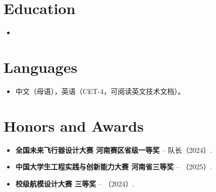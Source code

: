 \documentclass[11pt,a4paper,sans]{moderncv}
\begin{document}

\section{Education}
\vspace{1pt}
\begin{itemize}

\item{}

\end{itemize}


\section{Languages}
\vspace{1pt}
\begin{itemize}
\item 中文（母语），英语（CET-4，可阅读英文技术文档）。
\end{itemize}


\section{Honors and Awards}
\vspace{1pt}
\begin{itemize}
\item{\textbf{全国未来飞行器设计大赛 河南赛区省级一等奖} -- 队长（2024）.}
\item{\textbf{中国大学生工程实践与创新能力大赛 河南省三等奖} -- （2025）.}
\item{\textbf{校级航模设计大赛 三等奖} -- （2024）.}
\end{itemize}


\end{document}
